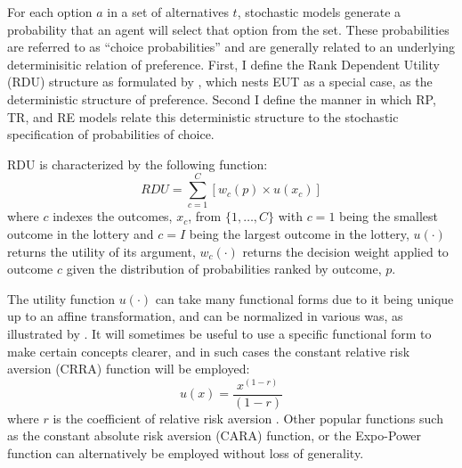 \documentclass[../main.tex]{subfiles}
\begin{document}
For each option $a$ in a set of alternatives $t$, stochastic models generate a probability that an agent will select that option from the set.
These probabilities are referred to as \enquote{choice probabilities} and are generally related to an underlying determinisitic relation of preference.
First, I define the Rank Dependent Utility (RDU) structure as formulated by \textcite{Quiggin1982}, which nests EUT as a special case, as the deterministic structure of preference.
Second I define the manner in which RP, TR, and RE  models relate this deterministic structure to the stochastic specification of probabilities of choice.

RDU is characterized by the following function:
\begin{equation}
	\label{eq2:RDU}
	RDU = \sum_{c=1}^{C} \left[ w_c(p) \times u(x_c) \right]
\end{equation}
\noindent where $c$ indexes the outcomes, $x_c$, from $\{1,\ldots,C\}$ with $c=1$ being the smallest outcome in the lottery and $c=I$ being the largest outcome in the lottery, $u(\cdot)$ returns the utility of its argument, $w_c(\cdot)$ returns the decision weight applied to outcome $c$ given the distribution of probabilities ranked by outcome, $p$.

The utility function $u(\cdot)$ can take many functional forms due to it being unique up to an affine transformation, and can be normalized in various was, as illustrated by \textcite{Hey1994}.
It will sometimes be useful to use a specific functional form to make certain concepts clearer, and in such cases the constant relative risk aversion (CRRA) function will be employed:
\begin{equation}
	\label{eq2:CRRA}
	u(x) = \frac{x^{(1-r)}}{(1-r)}
\end{equation}
\noindent where $r$ is the coefficient of relative risk aversion \parencite{Pratt1964}.
Other popular functions such as the constant absolute risk aversion (CARA) function, or the Expo-Power function \parencite{Saha1993} can alternatively be employed without loss of generality.
\end{document}
